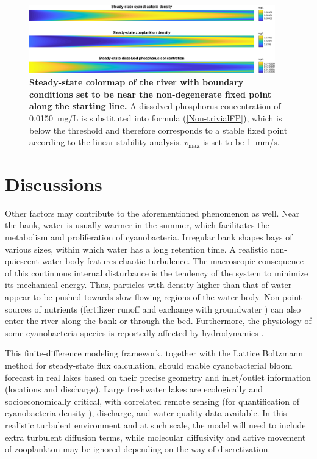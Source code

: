 \documentclass{article}
\begin{document}
\begin{figure}[H]
    \centering
    \includegraphics[width=0.95\textwidth]{Point0150Oscillate.pdf}
    \caption{\textbf{Steady-state colormap of the river with boundary conditions set to be near the non-degenerate fixed point along the starting line.} A dissolved phosphorus concentration of \SI{0.0150}{mg/L} is substituted into formula (\ref{Non-trivialFP}), which is below the threshold and therefore corresponds to a stable fixed point according to the linear stability analysis. $v_{\max}$ is set to be \SI{1}{mm/s}.}
    \label{PhaseOscillationBlurredByDiffusion}
\end{figure}

\section*{Discussions}
Other factors may contribute to the aforementioned phenomenon as well.
Near the bank, water is usually warmer in the summer, which facilitates the metabolism and proliferation of cyanobacteria. Irregular bank shapes bays of various sizes, within which water has a long retention time. A realistic non-quiescent water body features chaotic turbulence. The macroscopic consequence of this continuous internal disturbance is the tendency of the system to minimize its mechanical energy. Thus, particles with density higher than that of water appear to be pushed towards slow-flowing regions of the water body. Non-point sources of nutrients (fertilizer runoff and exchange with groundwater \cite{SubsurfaceP}) can also enter the river along the bank or through the bed. Furthermore, the physiology of some cyanobacteria species is reportedly affected by hydrodynamics \cite{HydrodynamicsInfluence}.

This finite-difference modeling framework, together with the Lattice Boltzmann method \cite{BGK} for steady-state flux calculation, should enable cyanobacterial bloom forecast in real lakes based on their precise geometry and inlet/outlet information (locations and discharge). Large freshwater lakes are ecologically and socioeconomically critical, with correlated remote sensing (for quantification of cyanobacteria density \cite{MuPI}), discharge, and water quality data available. In this realistic turbulent environment and at such scale, the model will need to include extra turbulent diffusion terms, while molecular diffusivity and active movement of zooplankton may be ignored depending on the way of discretization.
\end{document}
